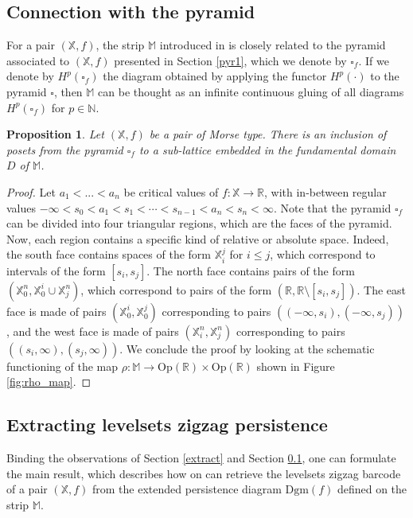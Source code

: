 \documentclass[11pt]{article}
\newtheorem{proposition}[theorem]{Proposition}
\theoremstyle{remark}
\newcommand{\N}{\mathbb{N}}
\newcommand{\R}{\mathbb{R}}
\newcommand{\X}{\mathbb{X}}
\newcommand{\M}{\mathbb{M}}
\begin{document}
\subsection{Connection with the pyramid}
\label{pyr_connection}
For a pair $(\X,f)$, the strip $\M$ introduced in \cite{bauer2021structure} is closely related to the pyramid associated to $(\X,f)$ presented in Section \ref{pyr1}, which we denote by $\square_f$. If we denote by $H^p(\square_f)$ the diagram obtained by applying the functor $H^p(\cdot)$ to the pyramid $\square$, then $\M$ can be thought as an infinite continuous gluing of all diagrams $H^p(\square_f)$ for $p\in\N$. 

\begin{proposition}
\label{connection_pyramids_prop}
Let $(\X,f)$ be a pair of Morse type. There is an inclusion of posets from the pyramid $\square_f$ to a sub-lattice embedded in the fundamental domain $D$ of $\M$. 
\end{proposition}

\begin{proof}
Let $a_1<...<a_n$ be critical values of $f:\X\rightarrow\R$, with in-between regular values $-\infty<s_0<a_1<s_1<\cdots<s_{n-1}<a_n<s_n<\infty$. Note that the pyramid $\square_f$ can be divided into four triangular regions, which are the faces of the pyramid. Now, each region contains a specific kind of relative or absolute space. Indeed, the south face contains spaces of the form $\X_i^j$ for $i\leq j$, which correspond to intervals of the form $[s_i,s_j]$. The north face contains pairs of the form $(\X_0^n,\X_0^i\cup\X_j^n)$, which correspond to pairs of the form $(\R,\R\setminus [s_i,s_j])$. The east face is made of pairs $(\X_0^i,\X_0^j)$ corresponding to pairs $((-\infty,s_i),(-\infty,s_j))$, and the west face is made of pairs $(\X_i^n,\X_j^n)$ corresponding to pairs $((s_i,\infty),(s_j,\infty))$. We conclude the proof by looking at the schematic functioning of the map $\rho:\M\rightarrow \mathrm{Op}(\mathbb{R})\times\mathrm{Op}(\mathbb{R})$ shown in Figure \ref{fig:rho_map}.
\end{proof}


\subsection{Extracting levelsets zigzag persistence}

Binding the observations of Section \ref{extract} and Section \ref{pyr_connection}, one can formulate the main result, which describes how on can retrieve the levelsets zigzag barcode of a pair $(\X,f)$ from the extended persistence diagram $\mathrm{Dgm}(f)$ defined on the strip $\M$.
\end{document}
